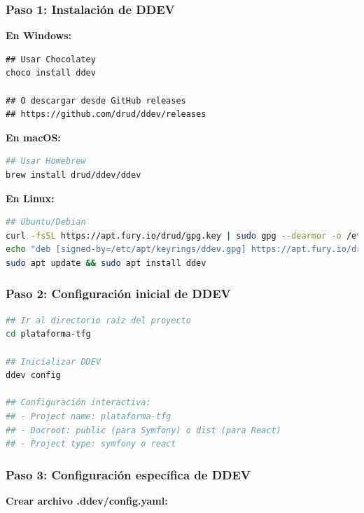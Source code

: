 \documentclass[12pt,a4paper,oneside]{report}
\begin{document}
{\subsubsection{Paso 1: Instalación de
DDEV}\label{paso-1-instalaciuxf3n-de-ddev}

\textbf{En Windows:}

\begin{lstlisting}
## Usar Chocolatey
choco install ddev

## O descargar desde GitHub releases
## https://github.com/drud/ddev/releases
\end{lstlisting}

\textbf{En macOS:}

\begin{lstlisting}[language=bash]
## Usar Homebrew
brew install drud/ddev/ddev
\end{lstlisting}

\textbf{En Linux:}

\begin{lstlisting}[language=bash]
## Ubuntu/Debian
curl -fsSL https://apt.fury.io/drud/gpg.key | sudo gpg --dearmor -o /etc/apt/keyrings/ddev.gpg
echo "deb [signed-by=/etc/apt/keyrings/ddev.gpg] https://apt.fury.io/drud/ * *" | sudo tee /etc/apt/sources.list.d/ddev.list
sudo apt update && sudo apt install ddev
\end{lstlisting}

\subsubsection{Paso 2: Configuración inicial de
DDEV}\label{paso-2-configuraciuxf3n-inicial-de-ddev}

\begin{lstlisting}[language=bash]
## Ir al directorio raíz del proyecto
cd plataforma-tfg

## Inicializar DDEV
ddev config

## Configuración interactiva:
## - Project name: plataforma-tfg
## - Docroot: public (para Symfony) o dist (para React)
## - Project type: symfony o react
\end{lstlisting}

\subsubsection{Paso 3: Configuración específica de
DDEV}\label{paso-3-configuraciuxf3n-especuxedfica-de-ddev}

\textbf{Crear archivo .ddev/config.yaml:}

}
\end{document}
